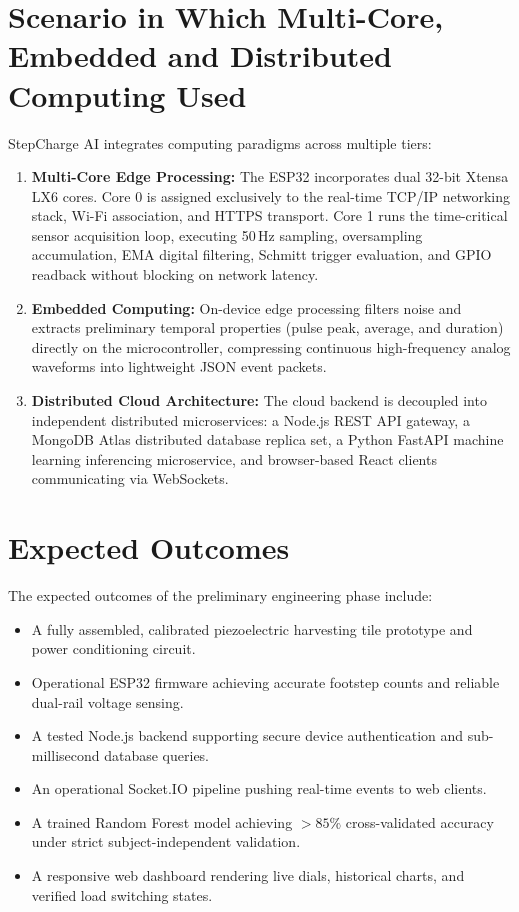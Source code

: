 \section{Scenario in Which Multi-Core, Embedded and Distributed Computing Used}
StepCharge AI integrates computing paradigms across multiple tiers:
\begin{enumerate}
    \item \textbf{Multi-Core Edge Processing:} The ESP32 incorporates dual 32-bit Xtensa LX6 cores. Core 0 is assigned exclusively to the real-time TCP/IP networking stack, Wi-Fi association, and HTTPS transport. Core 1 runs the time-critical sensor acquisition loop, executing 50\,Hz sampling, oversampling accumulation, EMA digital filtering, Schmitt trigger evaluation, and GPIO readback without blocking on network latency.
    \item \textbf{Embedded Computing:} On-device edge processing filters noise and extracts preliminary temporal properties (pulse peak, average, and duration) directly on the microcontroller, compressing continuous high-frequency analog waveforms into lightweight JSON event packets.
    \item \textbf{Distributed Cloud Architecture:} The cloud backend is decoupled into independent distributed microservices: a Node.js REST API gateway, a MongoDB Atlas distributed database replica set, a Python FastAPI machine learning inferencing microservice, and browser-based React clients communicating via WebSockets.
\end{enumerate}

\section{Expected Outcomes}
The expected outcomes of the preliminary engineering phase include:
\begin{itemize}
    \item A fully assembled, calibrated piezoelectric harvesting tile prototype and power conditioning circuit.
    \item Operational ESP32 firmware achieving accurate footstep counts and reliable dual-rail voltage sensing.
    \item A tested Node.js backend supporting secure device authentication and sub-millisecond database queries.
    \item An operational Socket.IO pipeline pushing real-time events to web clients.
    \item A trained Random Forest model achieving $>85\%$ cross-validated accuracy under strict subject-independent validation.
    \item A responsive web dashboard rendering live dials, historical charts, and verified load switching states.
\end{itemize}

